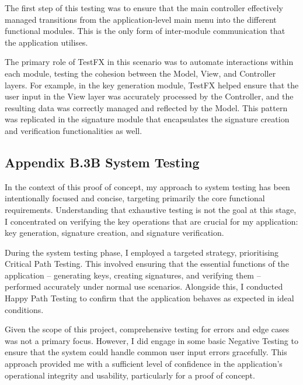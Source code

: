 \documentclass[]{final_report}
\theoremstyle{definition}
\begin{document}
The first step of this testing was to ensure that the main controller effectively managed transitions from the application-level main menu into the different functional modules. This is the only form of inter-module communication that the application utilises.

The primary role of TestFX in this scenario was to automate interactions within each module, testing the cohesion between the Model, View, and Controller layers. For example, in the key generation module, TestFX helped ensure that the user input in the View layer was accurately processed by the Controller, and the resulting data was correctly managed and reflected by the Model. This pattern was replicated in the signature module that encapsulates the signature creation and verification functionalities as well.



\subsection{Appendix B.3B System Testing}
In the context of this proof of concept, my approach to system testing has been intentionally focused and concise, targeting primarily the core functional requirements. Understanding that exhaustive testing is not the goal at this stage, I concentrated on verifying the key operations that are crucial for my application: key generation, signature creation, and signature verification.

During the system testing phase, I employed a targeted strategy, prioritising Critical Path Testing. This involved ensuring that the essential functions of the application – generating keys, creating signatures, and verifying them – performed accurately under normal use scenarios. Alongside this, I conducted Happy Path Testing to confirm that the application behaves as expected in ideal conditions.

Given the scope of this project, comprehensive testing for errors and edge cases was not a primary focus. However, I did engage in some basic Negative Testing to ensure that the system could handle common user input errors gracefully. This approach provided me with a sufficient level of confidence in the application's operational integrity and usability, particularly for a proof of concept.

\end{document}

